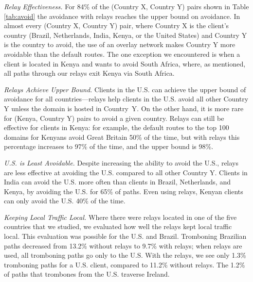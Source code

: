 {\it Relay Effectiveness.}
For 84\% of the (Country X, Country Y) pairs shown in Table \ref{tab:avoid} the avoidance with relays reaches the upper bound on avoidance. 
In almost every (Country X, Country Y) pair, where Country X is the
client's country (Brazil, Netherlands, India, Kenya, or the United
States) and Country Y is the country to avoid, the use of an overlay
network makes Country Y more avoidable than the default routes.  The one
exception we encountered is when a client is located in Kenya and wants
to avoid South Africa, where, as mentioned, all paths through our
relays exit Kenya via South Africa.

{\it Relays Achieve Upper Bound.}
Clients in the U.S. can achieve the upper bound of avoidance for all
countries---relays help clients in
the U.S. avoid all other Country Y unless the domain is hosted in Country~Y.  On the other hand,
it is more rare for (Kenya, Country Y) pairs to avoid a given country.  Relays can still
be effective for clients in Kenya: for example, the default routes to the top 100
domains for Kenyans avoid Great Britain 50\% of the time, but with relays this percentage increases to 97\% of the time, and the upper bound is 98\%.

{\it U.S. is Least Avoidable.} Despite increasing the ability to avoid the U.S., relays are less
effective at avoiding the U.S. compared to all other Country Y.
Clients in India can avoid the U.S. more often than clients in Brazil,
Netherlands, and Kenya, by avoiding the U.S. for 65\% of paths.  Even
using relays, Kenyan clients can only avoid the U.S. 40\% of the time.   

{\it Keeping Local Traffic Local.} Where there were relays located in one of the five
countries that we studied, we evaluated how well the relays kept local
traffic local.  This evaluation was possible for the U.S. and Brazil.
Tromboning Brazilian paths decreased from 13.2\% without relays to
9.7\% with relays; when relays are used, all tromboning paths go only
to the U.S.  With the relays, we see only 1.3\% tromboning paths for a
U.S. client, compared to 11.2\% without relays.  The 1.2\% of
paths that trombones from the U.S. traverse Ireland.
